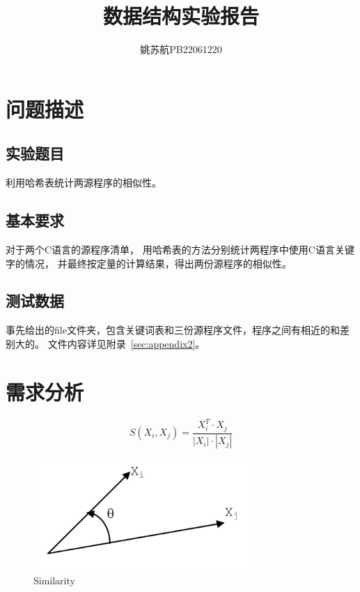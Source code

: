 \documentclass[a4paper]{article}
\title{\textbf{数据结构实验报告}}
\author{姚苏航\qquad PB22061220}
\date{}
\begin{document}
    \maketitle


    \section{问题描述}\label{sec:des}

    \subsection{实验题目}\label{subsec:q}
    {{利用哈希表统计两源程序的相似性。}}

    \subsection{基本要求}\label{subsec:req}
    {{对于两个C语言的源程序清单，
    用哈希表的方法分别统计两程序中使用C语言关键字的情况，
    并最终按定量的计算结果，得出两份源程序的相似性。}}

    \subsection{测试数据}\label{subsec:test}
    {{事先给出的file文件夹，包含关键词表和三份源程序文件，程序之间有相近的和差别大的。
    文件内容详见附录~\ref{sec:appendix2}。}}


    \section{需求分析}\label{sec:need}


    \begin{equation}
        S(X_i,X_j)=\frac{X_i^T\cdot X_j}{|X_i|\cdot|X_j|}\label{eq:equation}
    \end{equation}
    \begin{figure}[htbp]
        \centering
        \includegraphics[height=120pt]{S}
        \caption{Similarity}\label{fig:figure}
    \end{figure}
\end{document}
